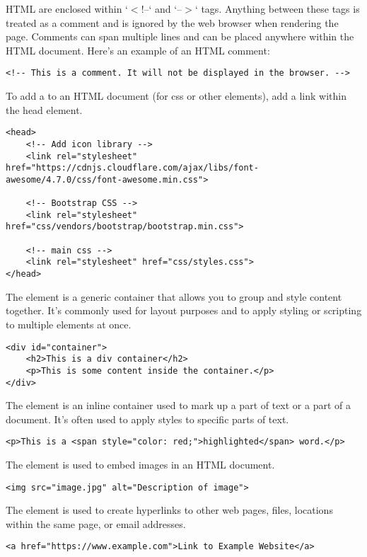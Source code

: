HTML  are enclosed within `$<$!--` and `--$>$` tags. Anything between these tags is treated as a comment and is ignored by the web browser when rendering the page. Comments can span multiple lines and can be placed anywhere within the HTML document. Here's an example of an HTML comment:
\begin{lstlisting}
<!-- This is a comment. It will not be displayed in the browser. -->
\end{lstlisting}

To add a  to an HTML document (for css or other elements), add a link within the head element.
\begin{lstlisting}
<head>		
	<!-- Add icon library -->
	<link rel="stylesheet" href="https://cdnjs.cloudflare.com/ajax/libs/font-awesome/4.7.0/css/font-awesome.min.css">		
		
	<!-- Bootstrap CSS -->
	<link rel="stylesheet" href="css/vendors/bootstrap/bootstrap.min.css">
	
	<!-- main css -->
	<link rel="stylesheet" href="css/styles.css">
</head>
\end{lstlisting}

The  element is a generic container that allows you to group and style content together. It's commonly used for layout purposes and to apply styling or scripting to multiple elements at once.

\begin{lstlisting}
<div id="container">
    <h2>This is a div container</h2>
    <p>This is some content inside the container.</p>
</div>
\end{lstlisting}

The  element is an inline container used to mark up a part of text or a part of a document. It's often used to apply styles to specific parts of text.

\begin{lstlisting}
<p>This is a <span style="color: red;">highlighted</span> word.</p>
\end{lstlisting}

The  element is used to embed images in an HTML document.

\begin{lstlisting}
<img src="image.jpg" alt="Description of image">
\end{lstlisting}

The  element is used to create hyperlinks to other web pages, files, locations within the same page, or email addresses.

\begin{lstlisting}
<a href="https://www.example.com">Link to Example Website</a>
\end{lstlisting}